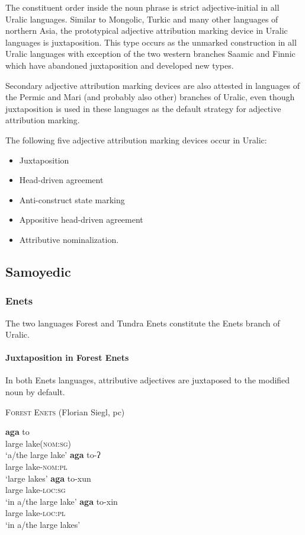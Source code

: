 The constituent order inside the noun phrase is strict adjective-initial in all Uralic languages. Similar to Mongolic, Turkic and many other languages of northern Asia, the prototypical adjective attribution marking device in Uralic languages is juxtaposition. This type occurs as the unmarked construction in all Uralic languages with exception of the two western branches Saamic and Finnic which have abandoned juxtaposition and developed new types.

Secondary adjective attribution marking devices are also attested in languages of the Permic and Mari (and probably also other) branches of Uralic, even though juxtaposition is used in these languages as the default strategy for adjective attribution marking.

The following five adjective attribution marking devices occur in Uralic:
\begin{itemize}
\item Juxtaposition
\item Head-driven agreement
\item Anti-construct state marking
\item Appositive head-driven agreement
\item Attributive nominalization.
\end{itemize}

\subsection{Samoyedic}
\subsubsection{Enets}
The two languages Forest and Tundra Enets constitute the Enets branch of Uralic.

\paragraph{Juxtaposition in Forest Enets}
In both Enets languages, attributive adjectives are juxtaposed to the modified noun by default.
\begin{exe}
\ex \textsc{Forest Enets} (Florian Siegl, pc) \label{enets juxt}%
\begin{xlist}
\ex 
\gll	\textbf{aga} to\\
	large lake(\textsc{nom:sg})\\
\glt	‘a/the large lake’
\ex 
\gll	\textbf{aga} to-ʔ\\
	large lake\textsc{-nom:pl}\\
\glt	‘large lakes’
\ex 
\gll	\textbf{aga} to-xun\\
	large lake\textsc{-loc:sg}\\
\glt	‘in a/the large lake’
\ex 
\gll	\textbf{aga} to-xin\\
	large lake\textsc{-loc:pl}\\
\glt	‘in a/the large lakes’
\end{xlist}
\end{exe}

